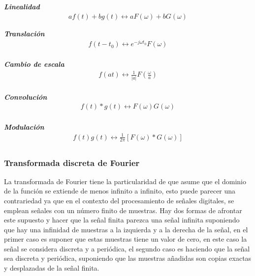 \noindent
\textbf{\textit{Linealidad}}\\
\indent
{}
\begin{align*}
	af(t) + bg(t) \longleftrightarrow aF(\omega) + bG(\omega)
\end{align*} 

\noindent
\textbf{\textit{Translaci\'on}}\\
\indent
{}
\begin{align*}
	 f(t-t_{0}) \longleftrightarrow e^{-j\omega t_{0}}F(\omega)\\
\end{align*} 

\noindent
\textbf{\textit{Cambio de escala}}\\
\indent
{}
\begin{align*}
	f(at) \longleftrightarrow \frac{1}{\left| a \right|}F(\frac{\omega}{a})\\
\end{align*} 

\noindent
\textbf{\textit{Convoluci\'on}}\\
\indent
{}
\begin{align*}
	 f(t)*g(t) \longleftrightarrow F(\omega)G(\omega)\\
\end{align*} 

\noindent
\textbf{\textit{Modulaci\'on}}\\
\indent
{}
\begin{align*}
	 f(t)g(t) \longleftrightarrow \frac{1}{2\pi}[F(\omega)*G(\omega)]\\
\end{align*} 


\subsubsection{Transformada discreta de Fourier}

La transformada de Fourier tiene la particularidad de que asume que el dominio de la funci\'on se extiende de menos infinito a infinito, esto puede parecer una contrariedad ya que en el contexto del procesamiento de señales digitales, se emplean señales con un n\'umero finito de muestras. Hay dos formas de afrontar este supuesto y hacer que la señal finita parezca una señal infinita suponiendo que hay una infinidad de muestras a la izquierda y a la derecha de la señal, en el primer caso es suponer que estas muestras tiene un valor de cero, en este caso la señal se considera discreta y a peri\'odica, el segundo caso es haciendo que la señal sea discreta y peri\'odica, suponiendo que las muestras añadidas son copias exactas y desplazadas de la señal finita.\\

